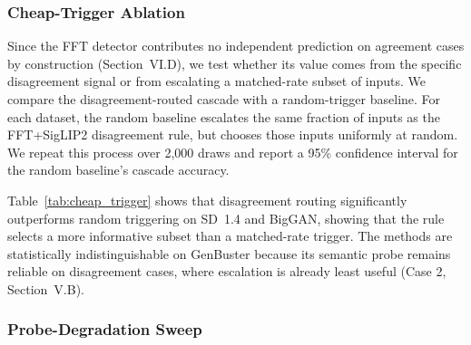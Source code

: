 \documentclass{ieeeaccess}
\begin{document}
\subsubsection{Cheap-Trigger Ablation}
\label{sec:cheap_trigger}

Since the FFT detector contributes no independent prediction on agreement cases by
construction (Section~VI.D), we test whether its value comes from the specific
disagreement signal or from escalating a matched-rate subset of inputs. We compare the
disagreement-routed cascade with a random-trigger baseline. For each dataset, the random
baseline escalates the same fraction of inputs as the FFT+SigLIP2 disagreement rule, but
chooses those inputs uniformly at random. We repeat this process over 2{,}000 draws and
report a 95\% confidence interval for the random baseline's cascade accuracy.

Table~\ref{tab:cheap_trigger} shows that disagreement routing significantly outperforms
random triggering on SD~1.4 and BigGAN, showing that the rule selects a more informative
subset than a matched-rate trigger. The methods are statistically indistinguishable on
GenBuster because its semantic probe remains reliable on disagreement cases, where
escalation is already least useful (Case 2, Section~V.B).

\begin{table}[h]
\centering
\caption{Disagreement routing versus a matched-rate random trigger on fixed held-out subsets (2,000 draws; 95\% CI). Results are interpreted within this ablation because its subsets differ from Table~\ref{tab:main_results}.}
\label{tab:cheap_trigger}
\footnotesize
\setlength{\tabcolsep}{3pt}
\end{table}

\subsubsection{Probe-Degradation Sweep}
\label{sec:limited_data}
\end{document}
